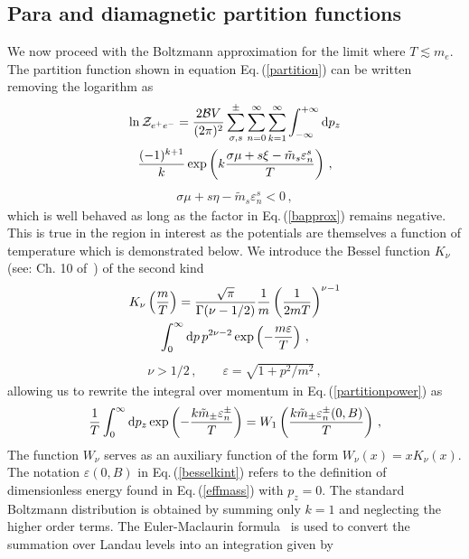 \documentclass[reprint]{revtex4-2}
\newcommand{\req}[1]{Eq.\,(\ref{#1})}
\begin{document}
\subsection{Para and diamagnetic partition functions}
\label{sec:paradia}
\noindent We now proceed with the Boltzmann approximation for the limit where $T\lesssim m_e$. The partition function shown in equation \req{partition} can be written removing the logarithm as
\begin{multline}
    \label{partitionpower}
    \ln{{\cal Z}_{e^{+}e^{-}}}=\frac{2{\cal B}V}{(2\pi)^{2}}\sum_{\sigma,s}^{\pm}\sum_{n=0}^{\infty}\sum_{k=1}^{\infty}\int_{-\infty}^{+\infty}{\rm d}p_{z}\\
    \frac{(-1)^{k+1}}{k}\exp\left({k\frac{\sigma\mu+s\xi-{\tilde m}_{s}\varepsilon^{s}_{n}}{T}}\right)\,,
\end{multline}
\begin{align}
   \label{bapprox} 
   \sigma\mu+s\eta-{\tilde m}_{s}\varepsilon_{n}^{s}<0\,,
\end{align}
which is well behaved as long as the factor in \req{bapprox} remains negative. This is true in the region in interest as the potentials are themselves a function of temperature which is demonstrated below. We introduce the Bessel function $K_{\nu}$ (see: Ch. 10 of~\cite{letessier2002hadrons}) of the second kind
\begin{multline}
    \label{besselk}
    K_{\nu}\left(\frac{m}{T}\right)=\frac{\sqrt{\pi}}{\Gamma(\nu-1/2)}\frac{1}{m}\left(\frac{1}{2mT}\right)^{\nu-1}\\
    \int_{0}^{\infty}{\rm d}p\,p^{2\nu-2}\exp\left({-\frac{m\varepsilon}{T}}\right)\,,
\end{multline}
\begin{align}
   \nu>1/2\,,\qquad\varepsilon=\sqrt{1+p^{2}/m^{2}}\,,
\end{align}
allowing us to rewrite the integral over momentum in \req{partitionpower} as
\begin{align}
    \label{besselkint}
    \frac{1}{T}\int_{0}^{\infty}{\rm d}p_{z}\exp\left({-\frac{k{\tilde m}_{\pm}\varepsilon_{n}^{\pm}}{T}}\right)=W_{1}\left(\frac{k{\tilde m}_{\pm}\varepsilon_{n}^{\pm}(0,B)}{T}\right)\,,
\end{align}
The function $W_{\nu}$ serves as an auxiliary function of the form $W_{\nu}(x)=xK_{\nu}(x)$. The notation $\varepsilon(0,B)$ in \req{besselkint} refers to the definition of dimensionless energy found in \req{effmass} with $p_{z}=0$. The standard Boltzmann distribution is obtained by summing only $k=1$ and neglecting the higher order terms. The Euler-Maclaurin formula~\cite{abramowitz1988handbook} is used to convert the summation over Landau levels into an integration given by
\end{document}

